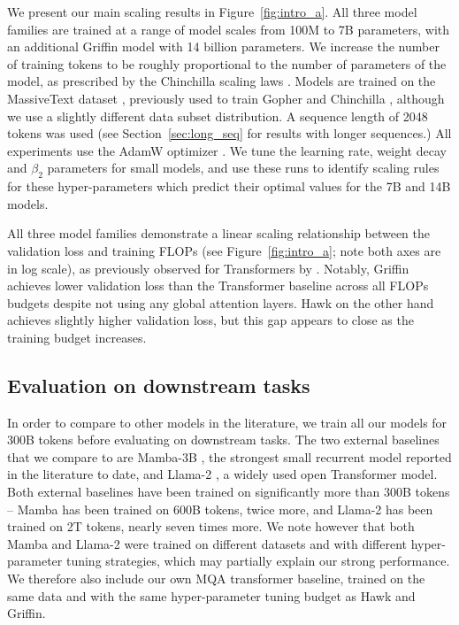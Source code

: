 We present our main scaling results in Figure~\ref{fig:intro_a}. 
All three model families are trained at a range of model scales from 100M to 7B parameters, with an additional Griffin model with 14 billion parameters. We increase the number of training tokens to be roughly proportional to the number of parameters of the model, as prescribed by the Chinchilla scaling laws \citep{hoffmann2022training}. Models are trained on the MassiveText dataset \citep{hoffmann2022training}, previously used to train Gopher \citep{rae2021scaling} and Chinchilla \citep{hoffmann2022training}, although we use a slightly different data subset distribution. A sequence length of 2048 tokens was used (see Section~\ref{sec:long_seq} for results with longer sequences.) All experiments use the AdamW optimizer \citep{loshchilov2017decoupled}. We tune the learning rate, weight decay and $\beta_2$ parameters for small models, and use these runs to identify scaling rules for these hyper-parameters which predict their optimal values for the 7B and 14B models.

All three model families demonstrate a linear scaling relationship between the validation loss and training FLOPs (see Figure~\ref{fig:intro_a}; note both axes are in log scale), as previously observed for Transformers by \citet{brown2020language}. 
Notably, Griffin achieves lower validation loss than the Transformer baseline across all FLOPs budgets despite not using any global attention layers. Hawk on the other hand achieves slightly higher validation loss, but this gap appears to close as the training budget increases. 

\subsection{Evaluation on downstream tasks}
\label{sec:downstream_evals}

In order to compare to other models in the literature, we train all our models for 300B tokens before evaluating on downstream tasks. The two external baselines that we compare to are Mamba-3B \citep{gu2023mamba}, the strongest small recurrent model reported in the literature to date, and Llama-2 \citep{touvron2023llama}, a widely used open Transformer model. Both external baselines have been trained on significantly more than 300B tokens -- Mamba has been trained on 600B tokens, twice more, and Llama-2 has been trained on 2T tokens, nearly seven times more. We note however that both Mamba and Llama-2 were trained on different datasets and with different hyper-parameter tuning strategies, which may partially explain our strong performance. We therefore also include our own MQA transformer baseline, trained on the same data and with the same hyper-parameter tuning budget as Hawk and Griffin.

